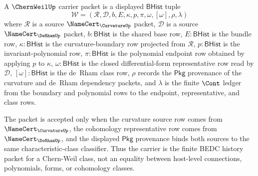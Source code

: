 \begin{definition}
\label{def:chernweil-carrier-packet}
A $\ChernWeilUp$ carrier packet is a displayed $\mathsf{BHist}$ tuple
$$
\mathcal{W}=(\mathcal{R},\mathcal{D},b,E,\kappa,p,\pi,\omega,[\omega],\rho,\lambda)
$$
where $\mathcal{R}$ is a source $\NameCert_{\CurvatureUp}$ packet, $\mathcal{D}$ is a source $\NameCert_{\DeRhamUp}$ packet, $b:\mathsf{BHist}$ is the shared base row, $E:\mathsf{BHist}$ is the bundle row, $\kappa:\mathsf{BHist}$ is the curvature-boundary row projected from $\mathcal{R}$, $p:\mathsf{BHist}$ is the invariant-polynomial row, $\pi:\mathsf{BHist}$ is the polynomial endpoint row obtained by applying $p$ to $\kappa$, $\omega:\mathsf{BHist}$ is the closed differential-form representative row read by $\mathcal{D}$, $[\omega]:\mathsf{BHist}$ is the de~Rham class row, $\rho$ records the $\mathsf{Pkg}$ provenance of the curvature and de~Rham dependency packets, and $\lambda$ is the finite $\Cont$ ledger from the boundary and polynomial rows to the endpoint, representative, and class rows.

The packet is accepted only when the curvature source row comes from $\NameCert_{\CurvatureUp}$, the cohomology representative row comes from $\NameCert_{\DeRhamUp}$, and the displayed $\mathsf{Pkg}$ provenance binds both sources to the same characteristic-class classifier. Thus the carrier is the finite BEDC history packet for a Chern-Weil class, not an equality between host-level connections, polynomials, forms, or cohomology classes.
\end{definition}

